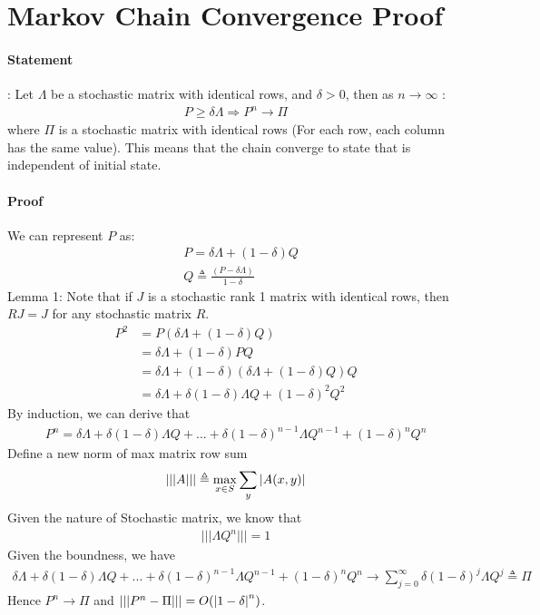 \section{Markov Chain Convergence Proof} 
\paragraph{Statement}: 
Let $\Lambda$ be a stochastic matrix with identical rows, and $\delta > 0$, then as $n\to \infty$ : 
    \begin{align*}
        P \geq \delta \Lambda \Longrightarrow P^n \to \Pi 
    \end{align*}
where $\Pi$ is a stochastic matrix with identical rows (For each row, each column has the same value). This means that the chain converge to state that is independent of initial state.

\paragraph{Proof} 
We can represent $P$ as: 
    \begin{align*}
        & P = \delta \Lambda + (1 - \delta) Q \\
        & Q \triangleq \frac{(P - \delta \Lambda)}{1-\delta}
    \end{align*}
Lemma 1: Note that if $J$ is a stochastic rank 1 matrix with identical rows, then $RJ=J$ for any stochastic matrix $R$.
    \begin{align*}
        P^2 
        & = P\left( \delta \Lambda + (1 - \delta) Q  \right) \\
        & = \delta \Lambda + (1-\delta) PQ \tag{$P\Lambda = \Lambda$ due to lemma 1}\\
        & = \delta \Lambda + (1-\delta) (\delta \Lambda + (1 - \delta) Q) Q\\
        & = \delta \Lambda + \delta (1 - \delta)\Lambda Q + (1-\delta)^2 Q^2
    \end{align*}
By induction, we can derive that 
    \begin{align*}
        P^n = \delta \Lambda + \delta (1-\delta) \Lambda Q + ... + \delta(1-\delta)^{n-1}\Lambda Q^{n-1} + (1-\delta)^n Q^n
    \end{align*}
Define a new norm of max matrix row sum 
    \begin{align*}
        \lvert\lvert\lvert A \rvert\rvert\rvert \triangleq  \max_{x\in S}\sum_y \left| A(x,y) \right|
    \end{align*}
Given the nature of Stochastic matrix, we know that 
    \begin{align*}
        \lvert\lvert\lvert \Lambda Q^n \rvert\rvert\rvert = 1
    \end{align*}
Given the boundness,  we have 
    \begin{align*}
        \delta \Lambda + \delta (1-\delta) \Lambda Q + ... + \delta(1-\delta)^{n-1}\Lambda Q^{n-1} + (1-\delta)^n Q^n \to \sum_{j=0}^\infty \delta(1-\delta)^j\Lambda Q^j \triangleq \Pi
    \end{align*}
Hence $P^n \to \Pi$ and $\lvert\lvert\lvert P^n - \Pi \rvert\rvert\rvert = O(\left| 1-\delta \right|^n)$. 

